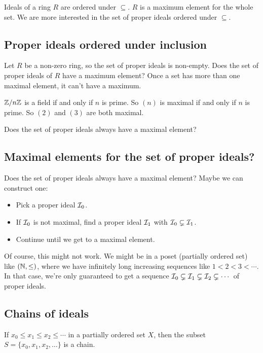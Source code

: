 \documentclass[12pt,letterpaper]{report}
\begin{document}
Ideals of a ring $R$ are ordered under $\subseteq$.
$R$ is a maximum element for the whole set.
We are more interested in the set of proper ideals ordered under $\subseteq$.

\pagebreak
\subsection{Proper ideals ordered under inclusion}

Let $R$ be a non-zero ring, so the set of proper ideals is non-empty.
Does the set of proper ideals of $R$ have a maximum element?
Once a set has more than one maximal element, it can't have a maximum.

\begin{ex}
  $\mathbb{Z}/{n}\mathbb{Z}$ is a field if and only if $n$ is prime.
  So $(n)$ is maximal if and only if $n$ is prime.
  So $(2)$ and $(3)$ are both maximal.
\end{ex}

Does the set of proper ideals always have a maximal element?

\pagebreak
\subsection{Maximal elements for the set of proper ideals?}

Does the set of proper ideals always have a maximal element?
Maybe we can construct one:
\begin{itemize}
  \item Pick a proper ideal $\mathcal{I}_0$.
  \item If $\mathcal{I}_0$ is not maximal, find a proper ideal $\mathcal{I}_1$ with
    $\mathcal{I}_0 \subsetneq \mathcal{I}_1$.
  \item Continue until we get to a maximal element.
\end{itemize}

Of course, this might not work.
We might be in a poset (partially ordered set) like $(\mathbb{N}, \leq)$, where we have infinitely long
increasing sequences like $1 < 2 < 3 < \cdots$.
In that case, we're only guaranteed to get a sequence
$\mathcal{I}_0 \subsetneq \mathcal{I}_1 \subsetneq \mathcal{I}_2 \subsetneq \cdots$ of proper ideals.

\pagebreak
\subsection{Chains of ideals}

If $x_0 \leq x_1 \leq x_2 \leq \cdots$ in a partially ordered set $X$, then the subset
$S = \{x_0, x_1, x_2, \ldots\}$ is a chain.
\end{document}

